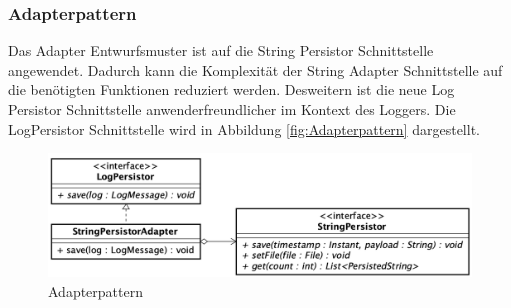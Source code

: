 \subsubsection{Adapterpattern}
Das Adapter Entwurfsmuster ist auf die String Persistor Schnittstelle angewendet. Dadurch kann die Komplexität der String Adapter Schnittstelle auf die benötigten Funktionen reduziert werden. Desweitern ist die neue Log Persistor Schnittstelle anwenderfreundlicher im Kontext des Loggers. Die LogPersistor Schnittstelle wird in Abbildung \ref{fig:Adapterpattern} dargestellt.
\begin{figure}[H]
	\centering
	\includegraphics[width=\textwidth]{2_Architektur/Bilder/adapterpattern.png}
	\caption{Adapterpattern}
	\label{fig:Adapterpatternn}
\end{figure}

